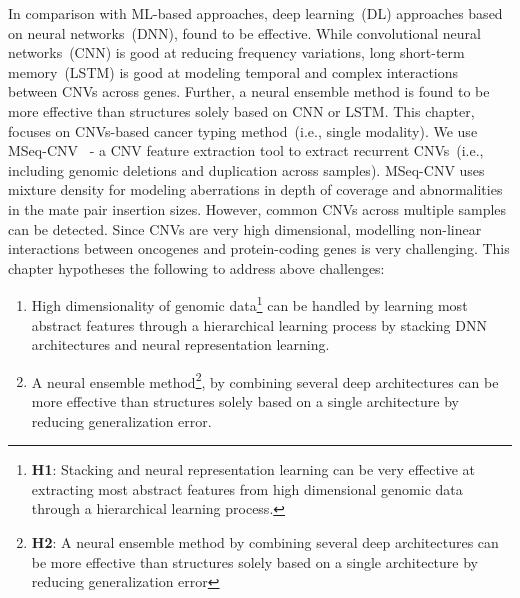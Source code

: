 \hspace*{3.5mm} In comparison with ML-based approaches, deep learning~(DL) approaches based on neural networks~(DNN), found to be effective. While convolutional neural networks~(CNN) is good at reducing frequency variations, long short-term memory~(LSTM) is good at modeling temporal and complex interactions between CNVs across genes. Further, a neural ensemble method is found to be more effective than structures solely based on CNN or LSTM. This chapter, focuses on CNVs-based cancer typing method~(i.e., single modality). We use MSeq-CNV~\cite{malekpour2018mseq} - a CNV feature extraction tool to extract recurrent CNVs~(i.e., including genomic deletions and duplication across samples). MSeq-CNV uses mixture density for modeling aberrations in depth of coverage and abnormalities in the mate pair insertion sizes. However, common CNVs across multiple samples can be detected. Since CNVs are very high dimensional, modelling non-linear interactions between oncogenes and protein-coding genes is very challenging. This chapter hypotheses the following to address above challenges: 

\begin{enumerate}[noitemsep]
    \item High dimensionality of genomic data\footnote{\textbf{H1}: Stacking and neural representation learning can be very effective at extracting most abstract features from high dimensional genomic data through a hierarchical learning process.} can be handled by learning most abstract features through a hierarchical learning process by stacking DNN architectures and neural representation learning. 
    \item A neural ensemble method\footnote{\textbf{H2}: A neural ensemble method by combining several deep architectures can be more effective than structures solely based on a single architecture by reducing generalization error}, by combining several deep architectures can be more effective than structures solely based on a single architecture by reducing generalization error.
\end{enumerate}

